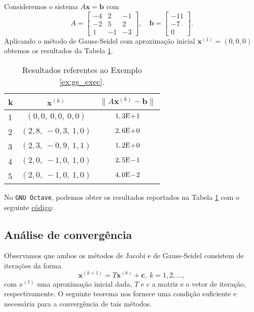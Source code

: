 \begin{ex}\label{ex:gs_exec}
  Consideremos o sistema $A\pmb{x} = \pmb{b}$ com
  \begin{equation}
    A =
    \begin{bmatrix}
      -4 & 2 & -1 \\
      -2 & 5 & 2 \\
       1 & -1 & -3
    \end{bmatrix},\quad
    \pmb{b} =
    \begin{bmatrix}
      -11\\ -7\\ 0
    \end{bmatrix}.
  \end{equation}
  Aplicando o método de Gauss-Seidel com aproximação inicial $\pmb{x}^{(1)} = (0, 0, 0)$ obtemos os resultados da Tabela \ref{tab:ex_gs_exec}.

  \begin{table}[h!]
    \centering
    \begin{tabular}{l|cc}
      k & $\pmb{x}^{(k)}$ & $\|A\pmb{x}^{(k)}-\pmb{b}\|$\\\hline
      1 & $(0,0,~0,0,~0,0)$ & $1,3\mathrm{E}\!+\!1$ \\
      2 & $(2,8,~-0,3,~1,0)$ & $2,6\mathrm{E}\!+\!0$ \\
      3 & $(2,3,~-0,9,~1,1)$ & $1,2\mathrm{E}\!+\!0$ \\
      4 & $(2,0,~-1,0,~1,0)$ & $2,5\mathrm{E}\!-\!1$ \\
      5 & $(2,0,~-1,0,~1,0)$ & $4,0\mathrm{E}\!-\!2$ \\\hline
    \end{tabular}
    \caption{Resultados referentes ao Exemplo \ref{ex:gs_exec}.}
    \label{tab:ex_gs_exec}
  \end{table}

\ifisoctave
No \verb+GNU Octave+, podemos obter os resultados reportados na Tabela \ref{tab:ex_gs_exec} com o seguinte \href{https://github.com/phkonzen/notas/blob/master/src/MatematicaNumerica/cap_sl_iter/dados/ex_gs_exec/ex_gs_exec.m}{código}:

\fi
\end{ex}

\subsection{Análise de convergência}

Observamos que ambos os métodos de Jacobi e de Gauss-Seidel consistem de iterações da forma
\begin{equation}
  \pmb{x}^{(k+1)} = T\pmb{x}^{(k)} + \pmb{c},~k=1, 2, \ldots,\label{eq:jgs_iter}
\end{equation}
com $x^{(1)}$ uma aproximação inicial dada, $T$ e $c$ a matriz e o vetor de iteração, respectivamente. O seguinte teorema nos fornece uma condição suficiente e necessária para a convergência de tais métodos.

